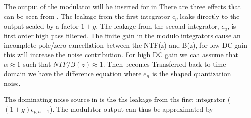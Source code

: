 The output of the modulator will be 
inserted for  in 
There are three effects that can be seen from . The
leakage from the first integrator $\epsilon_p$ leaks directly to the
output scaled by a factor $1+g$. The leakage from the second integrator, $\epsilon_u$, is first order high
pass filtered. The finite gain in the modulo
integrators cause an incomplete pole/zero cancellation between
the NTF(z) and B(z), for low DC gain this will increase the noise
contribution. For high DC gain we can assume that $\alpha \approx 1$
such that $NTF/B(z) \approx 1$. Then  becomes
Transferred back to time domain we have the difference
equation
where $e_n$ is the shaped quantization
noise.

 The dominating noise source in  is the
the leakage from the first integrator ($(1+g)\epsilon_{p,n-1}$). The
modulator output can thus be approximated by






